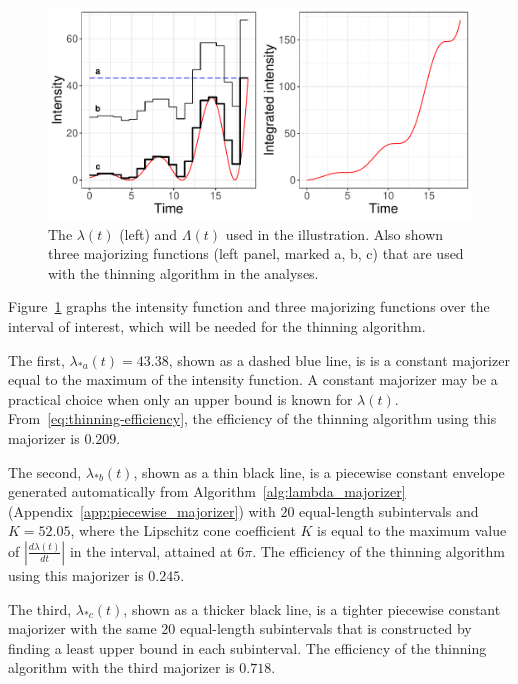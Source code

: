 \documentclass[article,nojss]{jss}\usepackage[]{graphicx}\usepackage[]{xcolor}
\makeatletter
\def\maxwidth{ %
  \ifdim\Gin@nat@width>\linewidth
    \linewidth
  \else
    \Gin@nat@width
  \fi
}
\newenvironment{knitrout}{}{} %
\newcommand{\der}[2]{\frac{d {#1}} {d{#2}}}
\makeatother
\begin{document}
\begin{knitrout}
\color{fgcolor}\begin{figure}
\includegraphics[width=\maxwidth]{figure/example-function-plot-1} \caption[The $\lambda(t)$ (left) and $\Lambda(t)$ used in the illustration]{The $\lambda(t)$ (left) and $\Lambda(t)$ used in the illustration. Also shown three majorizing functions (left panel, marked a, b, c) that are used with the thinning algorithm in the analyses.}\label{fig:example-function-plot}
\end{figure}

\end{knitrout}

Figure~\ref{fig:example-function-plot} graphs the intensity function and three majorizing functions over the interval of interest, which will be needed for the thinning algorithm.

The first, $\lambda_{*a}(t) = 43.38$, shown as a dashed blue line, is is a constant majorizer equal to the maximum of the intensity function. A constant majorizer may be a practical choice when only an upper bound is known for $\lambda(t)$.
From~\eqref{eq:thinning-efficiency}, the efficiency of the thinning algorithm using this majorizer is
$0.209$.

The second, $\lambda_{*b}(t)$, shown as a thin black line, is a piecewise constant envelope generated automatically from Algorithm~\ref{alg:lambda_majorizer} (Appendix~\ref{app:piecewise_majorizer}) with $20$ equal-length subintervals and ${K = 52.05}$, where the Lipschitz cone coefficient $K$ is equal to the maximum value of $|\der{\lambda(t)}{t}|$ in the interval, attained at $6\pi$.
The efficiency of the thinning algorithm using this majorizer is
$0.245$.

The third, $\lambda_{*c}(t)$, shown as a thicker black line, is a tighter piecewise constant majorizer with the same $20$ equal-length subintervals that is constructed by finding a least upper bound in each subinterval. The efficiency of the thinning algorithm with the third
majorizer is
$0.718$.
\end{document}

